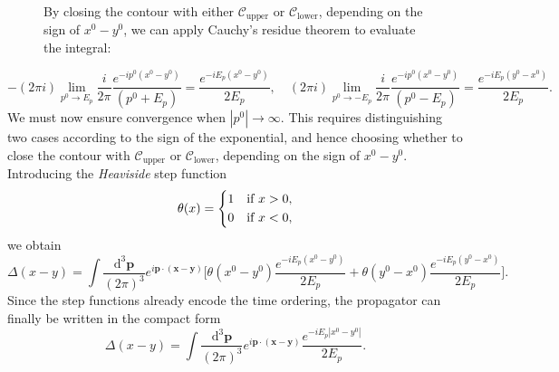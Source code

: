\begin{figure}[H]
\begin{minipage}{0.55\textwidth}
        By closing the contour with either \(\mathcal{C}_{\text{upper}}\) or \(\mathcal{C}_{\text{lower}}\), depending on the sign of \(x^0 - y^0\),
        we can apply Cauchy’s residue theorem to evaluate the integral:
    \end{minipage}
\end{figure}
\[
    - (2\pi i) \lim_{p^0 \to E_p}  \frac{i}{2\pi} \frac{e^{-ip^0(x^0 - y^0)}}{(p^0 + E_p)} = \frac{e^{-i E_p(x^0 - y^0)}}{2 E_p}, \quad (2\pi i) \lim_{p^0 \to -E_p}  \frac{i}{2\pi} \frac{e^{-ip^0(x^0 - y^0)}}{(p^0 - E_p)} = \frac{e^{-i E_p(y^0 - x^0)}}{2 E_p}.
\]
We must now ensure convergence when \(|p^0| \to \infty\).
This requires distinguishing two cases according to the sign of the exponential, and hence choosing whether to close the contour with \(\mathcal{C}_{\text{upper}}\) or \(\mathcal{C}_{\text{lower}}\), depending on the sign of \(x^0 - y^0\).
Introducing the \textit{Heaviside} step function
\[
    \theta(x) = \begin{dcases}
        1 & \text{if }  x > 0, \\
        0 & \text{if }  x < 0,
    \end{dcases}
\]
we obtain
\[
    \Delta(x - y) = \int \frac{\mathrm{d}^3\mathbf{p}}{(2\pi)^3} e^{i\mathbf{p} \cdot (\mathbf{x} - \mathbf{y})}
    \Bigg[
        \theta(x^0 - y^0) \frac{e^{-iE_p(x^0 - y^0)}}{2E_p}
        + \theta(y^0 - x^0) \frac{e^{-iE_p(y^0 - x^0)}}{2E_p}
        \Bigg].
\]
Since the step functions already encode the time ordering, the propagator can finally be written in the compact form
\[
    \Delta(x - y) = \int \frac{\mathrm{d}^3\mathbf{p}}{(2\pi)^3}
    e^{i\mathbf{p} \cdot (\mathbf{x} - \mathbf{y})}
    \frac{e^{-iE_p|x^0 - y^0|}}{2E_p}.
\]

